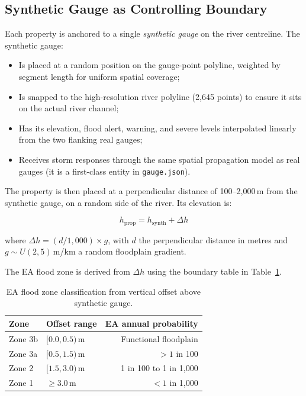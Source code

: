\documentclass[11pt,a4paper]{article}
\begin{document}
\subsection{Synthetic Gauge as Controlling Boundary}

Each property is anchored to a single \emph{synthetic gauge} on the river centreline.
The synthetic gauge:

\begin{itemize}[nosep]
    \item Is placed at a random position on the gauge-point polyline, weighted by
          segment length for uniform spatial coverage;
    \item Is snapped to the high-resolution river polyline (2{,}645 points) to ensure
          it sits on the actual river channel;
    \item Has its elevation, flood alert, warning, and severe levels interpolated
          linearly from the two flanking real gauges;
    \item Receives storm responses through the same spatial propagation model as real
          gauges (it is a first-class entity in \texttt{gauge.json}).
\end{itemize}

The property is then placed at a perpendicular distance of 100--2{,}000\,m from the
synthetic gauge, on a random side of the river. Its elevation is:

\begin{equation}
    h_{\text{prop}} = h_{\text{synth}} + \Delta h
    \label{eq:prop_elev}
\end{equation}

\noindent where $\Delta h = (d / 1{,}000) \times g$, with $d$ the perpendicular
distance in metres and $g \sim U(2, 5)$\,m/km a random floodplain gradient.

The EA flood zone is derived from $\Delta h$ using the boundary table in
Table~\ref{tab:zone_bounds}.

\begin{table}[H]
    \centering
    \caption{EA flood zone classification from vertical offset above synthetic gauge.}
    \label{tab:zone_bounds}
    \begin{tabular}{llr}
        \toprule
        \textbf{Zone} & \textbf{Offset range} & \textbf{EA annual probability} \\
        \midrule
        Zone 3b & $[0.0, 0.5)$\,m & Functional floodplain \\
        Zone 3a & $[0.5, 1.5)$\,m & $> 1$ in 100 \\
        Zone 2  & $[1.5, 3.0)$\,m & 1 in 100 to 1 in 1{,}000 \\
        Zone 1  & $\geq 3.0$\,m   & $< 1$ in 1{,}000 \\
        \bottomrule
    \end{tabular}
\end{table}
\end{document}
